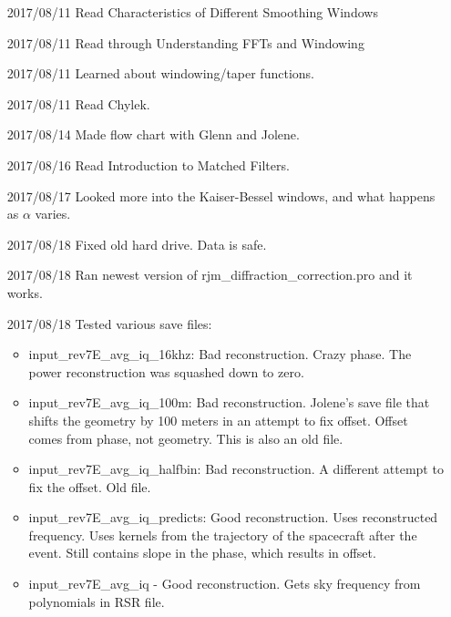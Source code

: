 \documentclass[crop=false,class=article,oneside]{standalone}
\begin{document}
\begin{enumerate}[leftmargin=55pt]
            \item[2017/08/11] Read Characteristics of
                              Different Smoothing Windows
            \item[2017/08/11] Read through Understanding FFTs
                              and Windowing
            \item[2017/08/11] Learned about windowing/taper functions.
            \item[2017/08/11] Read Chylek.
            \item[2017/08/14] Made flow chart with Glenn and Jolene.
            \item[2017/08/16] Read Introduction to Matched Filters.
            \item[2017/08/17] Looked more into the Kaiser-Bessel windows,
                              and what happens as $\alpha$ varies.
            \item[2017/08/18] Fixed old hard drive. Data is safe.
            \item[2017/08/18] Ran newest version of
                              rjm\_diffraction\_correction.pro
                              and it works.
            \item[2017/08/18] Tested various save files:
            \begin{itemize}
                \item input\_rev7E\_avg\_iq\_16khz: Bad reconstruction.
                      Crazy phase. The power reconstruction was squashed
                      down to zero.
                \item input\_rev7E\_avg\_iq\_100m: Bad reconstruction.
                      Jolene's save file that shifts the geometry by 100
                      meters in an attempt to fix offset. Offset comes
                      from phase, not geometry. This is also an old file.
                \item input\_rev7E\_avg\_iq\_halfbin: Bad reconstruction.
                      A different attempt to fix the offset. Old file.
                \item input\_rev7E\_avg\_iq\_predicts: Good reconstruction.
                      Uses reconstructed frequency. Uses kernels from the
                      trajectory of the spacecraft after the event. Still
                      contains slope in the phase, which results in offset.
                \item input\_rev7E\_avg\_iq - Good reconstruction.
                      Gets sky frequency from polynomials in RSR file.

\end{itemize}
\end{enumerate}
\end{document}
